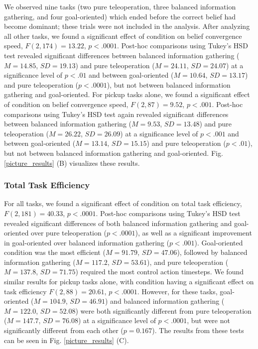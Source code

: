 \documentclass[conference]{IEEEtran}
\begin{document}
We observed nine tasks (two pure teleoperation, three balanced information gathering, and four goal-oriented) which ended before the correct belief had become dominant; these trials were not included in the analysis. After analyzing all other tasks, we found a significant effect of condition on belief convergence speed, $F(2, 174) = 13.22$, $p < .0001$. Post-hoc comparisons using Tukey's HSD test revealed significant differences between balanced information gathering ($M = 14.85$, $SD = 19.13$) and pure teleoperation ($M = 24.11$, $SD = 24.07$) at a significance level of $p < .01$ and between goal-oriented ($M = 10.64$, $SD = 13.17$) and pure teleoperation ($p < .0001$), but not between balanced information gathering and goal-oriented. For pickup tasks alone, we found a significant effect of condition on belief convergence speed, $F(2, 87) = 9.52$, $p < .001$. Post-hoc comparisons using Tukey's HSD test again revealed significant differences between balanced information gathering ($M = 9.53$, $SD = 13.48$) and pure teleoperation ($M = 26.22$, $SD = 26.09$) at a significance level of $p < .001$ and between goal-oriented ($M = 13.14$, $SD = 15.15$) and pure teleoperation ($p < .01$), but not between balanced information gathering and goal-oriented. Fig. \ref{picture_results} (B) visualizes these results.

\subsubsection{Total Task Efficiency}

For all tasks, we found a significant effect of condition on total task efficiency, $F(2, 181) = 40.33$, $p < .0001$. Post-hoc comparisons using Tukey's HSD test revealed significant differences of both balanced information gathering and goal-oriented over pure teleoperation ($p < .0001$), as well as a significant improvement in goal-oriented over balanced information gathering ($p < .001$). Goal-oriented condition was the most efficient ($M = 91.79$, $SD = 47.06$), followed by balanced information gathering ($M = 117.2$, $SD = 53.61$), and pure teleoperation ($M = 137.8$, $SD = 71.75$) required the most control action timesteps. We found similar results for pickup tasks alone, with condition having a significant effect on task efficiency $F(2, 88) = 20.61$, $p < .0001$. However, for these tasks, goal-oriented ($M = 104.9$, $SD = 46.91$) and balanced information gathering ($M = 122.0$, $SD = 52.08$) were both significantly different from pure teleoperation ($M = 147.7$, $SD = 76.08$) at a significance level of $p < .0001$, but were not significantly different from each other ($p = 0.167$). The results from these tests can be seen in Fig. \ref{picture_results} (C).
\end{document}
